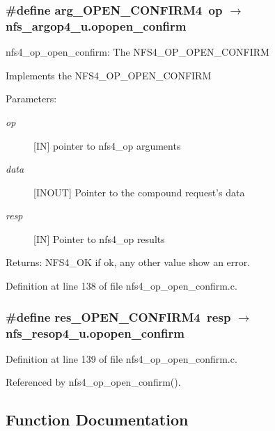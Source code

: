\subsubsection{\setlength{\rightskip}{0pt plus 5cm}\#define arg\_\-OPEN\_\-CONFIRM4\ op $\rightarrow$ nfs\_\-argop4\_\-u.opopen\_\-confirm}\label{nfs4__op__open__confirm_8c_a0}


nfs4\_\-op\_\-open\_\-confirm: The NFS4\_\-OP\_\-OPEN\_\-CONFIRM

Implements the NFS4\_\-OP\_\-OPEN\_\-CONFIRM

\begin{Desc}
\item[Parameters:]
\begin{description}
\item[{\em op}][IN] pointer to nfs4\_\-op arguments \item[{\em data}][INOUT] Pointer to the compound request's data \item[{\em resp}][IN] Pointer to nfs4\_\-op results\end{description}
\end{Desc}
\begin{Desc}
\item[Returns:]NFS4\_\-OK if ok, any other value show an error. \end{Desc}


Definition at line 138 of file nfs4\_\-op\_\-open\_\-confirm.c.
\subsubsection{\setlength{\rightskip}{0pt plus 5cm}\#define res\_\-OPEN\_\-CONFIRM4\ resp $\rightarrow$ nfs\_\-resop4\_\-u.opopen\_\-confirm}\label{nfs4__op__open__confirm_8c_a1}




Definition at line 139 of file nfs4\_\-op\_\-open\_\-confirm.c.

Referenced by nfs4\_\-op\_\-open\_\-confirm().

\subsection{Function Documentation}
